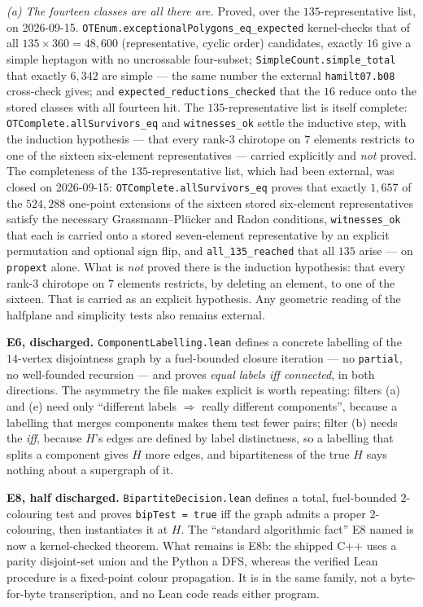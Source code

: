 \documentclass[11pt,a4paper]{article}
\theoremstyle{plain}
\theoremstyle{definition}
\theoremstyle{remark}
\begin{document}
\emph{(a) The fourteen classes are all there are.} Proved, over the
$135$-representative list, on 2026-09-15.
\texttt{OTEnum.exceptionalPolygons\_eq\_expected} kernel-checks that of all
$135\times360=48{,}600$ (representative, cyclic order) candidates, exactly $16$
give a simple heptagon with no uncrossable four-subset;
\texttt{SimpleCount.simple\_total} that exactly $6{,}342$ are simple --- the
same number the external \texttt{hamilt07.b08} cross-check gives; and
\texttt{expected\_reductions\_checked} that the $16$ reduce onto the stored
classes with all fourteen hit. The $135$-representative list is itself complete:
\texttt{OTComplete.allSurvivors\_eq} and \texttt{witnesses\_ok} settle the
inductive step, with the induction hypothesis --- that every rank-$3$ chirotope
on $7$ elements restricts to one of the sixteen six-element representatives ---
carried explicitly and \emph{not} proved. The completeness of the $135$-representative list, which had been external,
was closed on 2026-09-15: \texttt{OTComplete.allSurvivors\_eq} proves that
exactly $1{,}657$ of the $524{,}288$ one-point extensions of the sixteen stored
six-element representatives satisfy the necessary Grassmann--Pl\"ucker and Radon
conditions, \texttt{witnesses\_ok} that each is carried onto a stored
seven-element representative by an explicit permutation and optional sign flip,
and \texttt{all\_135\_reached} that all $135$ arise --- on \texttt{propext}
alone. What is \emph{not} proved there is the induction hypothesis: that every
rank-$3$ chirotope on $7$ elements restricts, by deleting an element, to one of
the sixteen. That is carried as an explicit hypothesis. Any geometric reading of
the halfplane and simplicity tests also remains external.

\textbf{\textsf{E6}, discharged.} \texttt{ComponentLabelling.lean} defines a
concrete labelling of the $14$-vertex disjointness graph by a fuel-bounded
closure iteration --- no \texttt{partial}, no well-founded recursion --- and
proves \emph{equal labels iff connected}, in both directions. The asymmetry the
file makes explicit is worth repeating: filters (a) and (e) need only ``different
labels $\Rightarrow$ really different components'', because a labelling that
merges components makes them test fewer pairs; filter (b) needs the \emph{iff},
because $H$'s edges are defined by label distinctness, so a labelling that splits
a component gives $H$ more edges, and bipartiteness of the true $H$ says nothing
about a supergraph of it.

\textbf{\textsf{E8}, half discharged.} \texttt{BipartiteDecision.lean} defines a
total, fuel-bounded $2$-colouring test and proves \texttt{bipTest = true} iff the
graph admits a proper $2$-colouring, then instantiates it at $H$. The
``standard algorithmic fact'' \textsf{E8} named is now a kernel-checked theorem.
What remains is \textsf{E8b}: the shipped C++ uses a parity disjoint-set union
and the Python a DFS, whereas the verified Lean procedure is a fixed-point
colour propagation. It is in the same family, not a byte-for-byte transcription,
and no Lean code reads either program.
\end{document}
